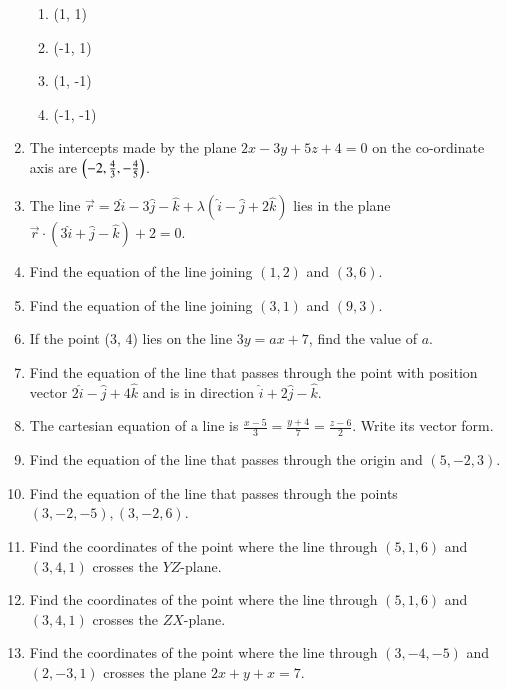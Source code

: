 \begin{enumerate}[label=\thesubsection.\arabic*, ref=\thesubsection.\theenumi]
\begin{enumerate}
\item (1, 1)
\item (-1, 1)
\item (1, -1)
\item (-1, -1)
\end{enumerate}
\item The intercepts made by the plane $2x-3y+5z+4=0$ on the co-ordinate axis are $\left(-2, \frac{4}{3}, -\frac{4}{5}\right)$.
\item The line $\overrightarrow{r}=2\hat{i}-3\hat{j}-\hat{k}+\lambda(\hat{i}-\hat{j}+2\hat{k})$ lies in the plane $\overrightarrow{r} \cdot (3\hat{i}+\hat{j}-\hat{k})+2=0$.
\item Find the equation of the line joining $(1, 2)$ and $(3, 6)$.
\item Find the equation of the line joining $(3, 1)$ and $(9, 3)$.
\item If the point (3,  4) lies on the line $3y=ax+7$,  find the value of $a$.
\item  Find the equation of the line that passes through the point with position vector $2\hat{i}-\hat{j}+4\hat{k}$ and is in direction $\hat{i}+2\hat{j}-\hat{k}$.
\item The cartesian equation of a line is $ \frac{x-5}{3}=\frac{y+4}{7}=\frac{z-6}{2}$. Write its vector form.
\item Find the equation of the line that passes through the origin and $(5, -2, 3)$.
\item Find the equation of the line that passes through the points $(3, -2, -5), (3, -2, 6)$.
\item Find the coordinates of the point where the line through $(5,1,6)$ and $(3,4,1)$ crosses the $YZ$-plane.
\item Find the coordinates of the point where the line through $(5,1,6)$ and $(3,4,1)$ crosses the $ZX$-plane.
\item Find the coordinates of the point where the line through $(3,-4,-5)$ and $(2,-3,1)$ crosses the plane $2x+y+x=7$.
\end{enumerate}
